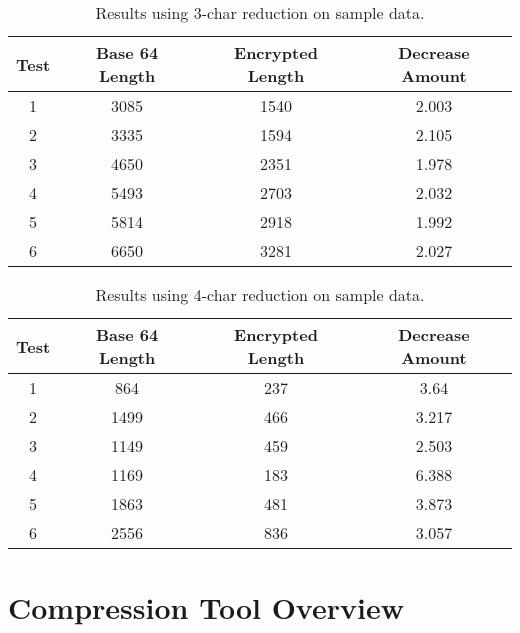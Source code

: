 \documentclass[amsmath,12pt,a4paper]{amsart}
\begin{document}
\begin{table}[h]
    \centering
    \caption{Results using 3-char reduction on sample data.}
    \begin{tabular}{|c|c|c|c|}
        \hline
        Test & Base 64 Length & Encrypted Length & Decrease Amount \\
        \hline
        1 & 3085 & 1540 & 2.003 \\
        2 & 3335 & 1594 & 2.105 \\
        3 & 4650 & 2351 & 1.978 \\
        4 & 5493 & 2703 & 2.032 \\
        5 & 5814 & 2918 & 1.992 \\
        6 & 6650 & 3281 & 2.027 \\
        \hline
    \end{tabular}
\end{table}

\begin{table}[h]
    \centering
    \caption{Results using 4-char reduction on sample data.}
    \begin{tabular}{|c|c|c|c|}
        \hline
        Test & Base 64 Length & Encrypted Length & Decrease Amount \\
        \hline
        1 & 864 & 237 & 3.64 \\
        2 & 1499 & 466 & 3.217 \\
        3 & 1149 & 459 & 2.503 \\
        4 & 1169 & 183 & 6.388 \\
        5 & 1863 & 481 & 3.873 \\
        6 & 2556 & 836 & 3.057 \\
        \hline
    \end{tabular}
\end{table}


\section{Compression Tool Overview}
\end{document}
